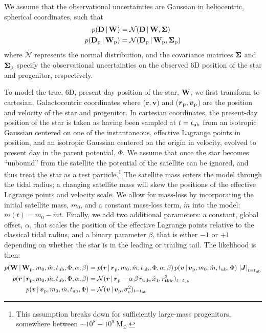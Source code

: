 \documentclass[letterpaper,12pt,preprint]{aastex}
\newcommand{\given}{\,|\,}
\newcommand{\D}{{\bf D}}
\newcommand{\W}{{\bf W}}
\newcommand{\J}{{\boldsymbol J}}
\newcommand{\bSigma}{{\bf \Sigma}}
\newcommand{\rtide}{r_{\rm tide}}
\newcommand{\bs}{\boldsymbol}
\newcommand{\sat}{{\rm p}}
\newcommand{\tub}{t_{\rm ub}}
\newcommand{\tailbit}{\beta}
\newcommand{\Loffset}{\alpha}
\begin{document}
We assume that the observational uncertainties are Gaussian in heliocentric, spherical coordinates, such that
\begin{align}
	p(\D \given \W) &= \mathcal{N}(\D \given \W, \bSigma)\label{eq:obsstar}\\
	p(\D_\sat \given \W_\sat) &= \mathcal{N}(\D_\sat \given \W_\sat, \bSigma_\sat)\label{eq:obsprog}
\end{align}
where $\mathcal{N}$ represents the normal distribution, and the covariance matrices $\bSigma$ and $\bSigma_\sat$ specify the observational uncertainties on the observed 6D position of the star and progenitor, respectively. 

To model the true, 6D, present-day position of the star, $\W$, we first transform to cartesian, Galactocentric coordinates where ($\bs{r},\bs{v}$) and ($\bs{r}_\sat,\bs{v}_\sat$) are the position and velocity of the star and progenitor. In cartesian coordinates, the present-day position of the star is taken as having been sampled at $t=\tub$ from an isotropic Gaussian centered on one of the instantaneous, effective Lagrange points in position, and an isotropic Gaussian centered on the origin in velocity, evolved to present day in the parent potential, $\Phi$. We assume that once the star becomes ``unbound'' from the satellite the potential of the satellite can be ignored, and thus treat the star as a test particle.\footnote{This assumption breaks down for sufficiently large-mass progenitors, somewhere between $\sim10^8-10^9~$M$_\odot$.} The satellite mass enters the model through the tidal radius; a changing satellite mass will skew the positions of the effective Lagrange points and velocity scale. We allow for mass-loss by incorporating the initial satellite mass, $m_0$, and a constant mass-loss term, $\dot{m}$ into the model: $m(t) = m_0 - \dot{m}t$. Finally, we add two additional parameters: a constant, global offset, $\Loffset$, that scales the position of the effective Lagrange points relative to the classical tidal radius, and a binary parameter $\tailbit$, that is either $-1$ or $+1$ depending on whether the star is in the leading or trailing tail. The likelihood is then:
\begin{align}
	p(\W \given \W_\sat, m_0, \dot{m}, \tub, \Phi, \Loffset, \tailbit) &= p(\bs{r} \given \bs{r}_\sat, m_0, \dot{m}, \tub, \Phi, \Loffset, \tailbit)\,p(\bs{v} \given \bs{v}_\sat, m_0, \dot{m}, \tub, \Phi)\,\left\vert\J\right\vert_{t=\tub}\\
	p(\bs{r} \given \bs{r}_\sat, m_0, \dot{m}, \tub, \Phi, \Loffset, \tailbit) &= \mathcal{N}(\bs{r} \given \bs{r}_\sat - \Loffset\,\tailbit\,\rtide\,\hat{x}_1, \rtide^2)_{t=\tub}\\
	p(\bs{v} \given \bs{v}_\sat, m_0, \dot{m}, \tub, \Phi) &= \mathcal{N}(\bs{v} \given \bs{v}_\sat, \sigma^2_v)_{t=\tub}
\end{align}
\end{document}
